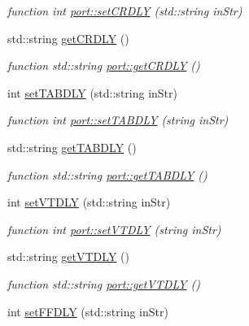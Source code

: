 \begin{DoxyCompactItemize}
\begin{DoxyCompactList}\small\item\em function int \hyperlink{classport_afca1f60b0977cd228f12a8ef4c771fc4}{port\+::set\+C\+R\+D\+LY} (std\+::string in\+Str) \end{DoxyCompactList}\item 
std\+::string \hyperlink{classport_a4977770fd7700ed83c1aeb290de881a3}{get\+C\+R\+D\+LY} ()
\begin{DoxyCompactList}\small\item\em function std\+::string \hyperlink{classport_a4977770fd7700ed83c1aeb290de881a3}{port\+::get\+C\+R\+D\+LY} () \end{DoxyCompactList}\item 
int \hyperlink{classport_a67bc0162f685499eed5d57e4be9d9272}{set\+T\+A\+B\+D\+LY} (std\+::string in\+Str)
\begin{DoxyCompactList}\small\item\em function int \hyperlink{classport_a67bc0162f685499eed5d57e4be9d9272}{port\+::set\+T\+A\+B\+D\+LY} (string in\+Str) \end{DoxyCompactList}\item 
std\+::string \hyperlink{classport_a481eb9d22358475a06bacd5368e6fb28}{get\+T\+A\+B\+D\+LY} ()
\begin{DoxyCompactList}\small\item\em function std\+::string \hyperlink{classport_a481eb9d22358475a06bacd5368e6fb28}{port\+::get\+T\+A\+B\+D\+LY} () \end{DoxyCompactList}\item 
int \hyperlink{classport_a659fafa1c6894eeb8d850868b79141e6}{set\+V\+T\+D\+LY} (std\+::string in\+Str)
\begin{DoxyCompactList}\small\item\em function int \hyperlink{classport_a659fafa1c6894eeb8d850868b79141e6}{port\+::set\+V\+T\+D\+LY} (string in\+Str) \end{DoxyCompactList}\item 
std\+::string \hyperlink{classport_a7f0a523dd9a9db4549788da5c79cf846}{get\+V\+T\+D\+LY} ()
\begin{DoxyCompactList}\small\item\em function std\+::string \hyperlink{classport_a7f0a523dd9a9db4549788da5c79cf846}{port\+::get\+V\+T\+D\+LY} () \end{DoxyCompactList}\item 
int \hyperlink{classport_aac53f4a9f4f82a6886d7d3ea3a313880}{set\+F\+F\+D\+LY} (std\+::string in\+Str)

\end{DoxyCompactItemize}
